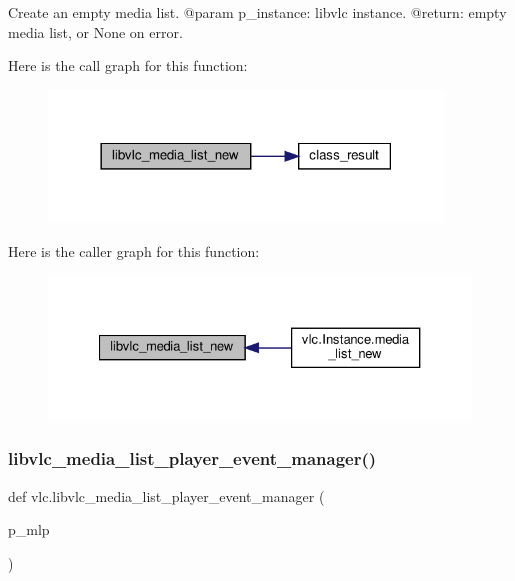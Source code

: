 \begin{DoxyVerb}Create an empty media list.
@param p_instance: libvlc instance.
@return: empty media list, or None on error.
\end{DoxyVerb}
 Here is the call graph for this function\+:
\nopagebreak
\begin{figure}[H]
\begin{center}
\leavevmode
\includegraphics[width=297pt]{namespacevlc_ade7073aea18b2eb92b103ed962f73d95_cgraph}
\end{center}
\end{figure}
Here is the caller graph for this function\+:
\nopagebreak
\begin{figure}[H]
\begin{center}
\leavevmode
\includegraphics[width=327pt]{namespacevlc_ade7073aea18b2eb92b103ed962f73d95_icgraph}
\end{center}
\end{figure}
\mbox{\label{namespacevlc_ace48e0ef2379ca0f1fbdbefdcc251cfe}} 
\subsubsection{\texorpdfstring{libvlc\+\_\+media\+\_\+list\+\_\+player\+\_\+event\+\_\+manager()}{libvlc\_media\_list\_player\_event\_manager()}}
{\footnotesize\ttfamily def vlc.\+libvlc\+\_\+media\+\_\+list\+\_\+player\+\_\+event\+\_\+manager (\begin{DoxyParamCaption}\item[{}]{p\+\_\+mlp }\end{DoxyParamCaption})}

